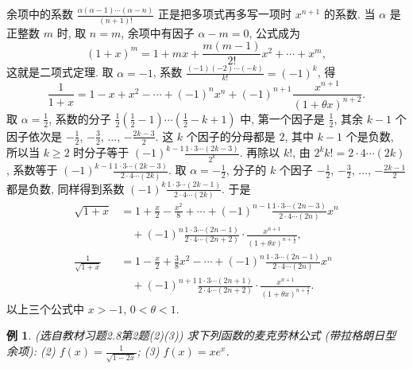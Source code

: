 \documentclass[UTF8,openany]{ctexbook}
\theoremstyle{chinesetextbook}
\newtheorem{example}{例}[section]
\begin{document}
余项中的系数 $\displaystyle\frac{\alpha(\alpha-1)\cdots(\alpha-n)}{(n+1)!}$ 正是把多项式再多写一项时 $x^{n+1}$ 的系数. 当 $\alpha$ 是正整数 $m$ 时, 取 $n=m$, 余项中有因子 $\alpha-m=0$, 公式成为
\[
(1+x)^m=1+mx+\frac{m(m-1)}{2!}x^2+\cdots+x^m,
\]
这就是二项式定理. 取 $\alpha=-1$, 系数 $\displaystyle\frac{(-1)(-2)\cdots(-k)}{k!}=(-1)^k$, 得
\[
\frac1{1+x}=1-x+x^2-\cdots+(-1)^nx^n+(-1)^{n+1}\frac{x^{n+1}}{(1+\theta x)^{n+2}}.
\]
取 $\displaystyle\alpha=\frac12$, 系数的分子 $\displaystyle\frac12\left(\frac12-1\right)\cdots\left(\frac12-k+1\right)$ 中, 第一个因子是 $\displaystyle\frac12$, 其余 $k-1$ 个因子依次是 $\displaystyle-\frac12$, $\displaystyle-\frac32$, $\ldots$, $\displaystyle-\frac{2k-3}2$. 这 $k$ 个因子的分母都是 $2$, 其中 $k-1$ 个是负数, 所以当 $k\ge2$ 时分子等于 $\displaystyle(-1)^{k-1}\frac{1\cdot3\cdots(2k-3)}{2^k}$. 再除以 $k!$, 由 $2^kk!=2\cdot4\cdots(2k)$, 系数等于 $\displaystyle(-1)^{k-1}\frac{1\cdot3\cdots(2k-3)}{2\cdot4\cdots(2k)}$. 取 $\displaystyle\alpha=-\frac12$, 分子的 $k$ 个因子 $\displaystyle-\frac12$, $\displaystyle-\frac32$, $\ldots$, $\displaystyle-\frac{2k-1}2$ 都是负数, 同样得到系数 $\displaystyle(-1)^k\frac{1\cdot3\cdots(2k-1)}{2\cdot4\cdots(2k)}$. 于是
\[
\begin{aligned}
\sqrt{1+x}&=1+\frac x2-\frac{x^2}8+\cdots+(-1)^{n-1}\frac{1\cdot3\cdots(2n-3)}{2\cdot4\cdots(2n)}x^n\\
&\quad+(-1)^n\frac{1\cdot3\cdots(2n-1)}{2\cdot4\cdots(2n+2)}\cdot\frac{x^{n+1}}{(1+\theta x)^{n+\frac12}},\\
\frac1{\sqrt{1+x}}&=1-\frac x2+\frac38x^2-\cdots+(-1)^n\frac{1\cdot3\cdots(2n-1)}{2\cdot4\cdots(2n)}x^n\\
&\quad+(-1)^{n+1}\frac{1\cdot3\cdots(2n+1)}{2\cdot4\cdots(2n+2)}\cdot\frac{x^{n+1}}{(1+\theta x)^{n+\frac32}}.
\end{aligned}
\]
以上三个公式中 $x>-1$, $0<\theta<1$.
\begin{example}\label{ex:c2-h8-2}
\textnormal{(选自教材习题2.8第2题(2)(3))} 求下列函数的麦克劳林公式 (带拉格朗日型余项): (2) $\displaystyle f(x)=\frac1{\sqrt{1-2x}}$; (3) $f(x)=xe^x$.
\end{example}
\end{document}
